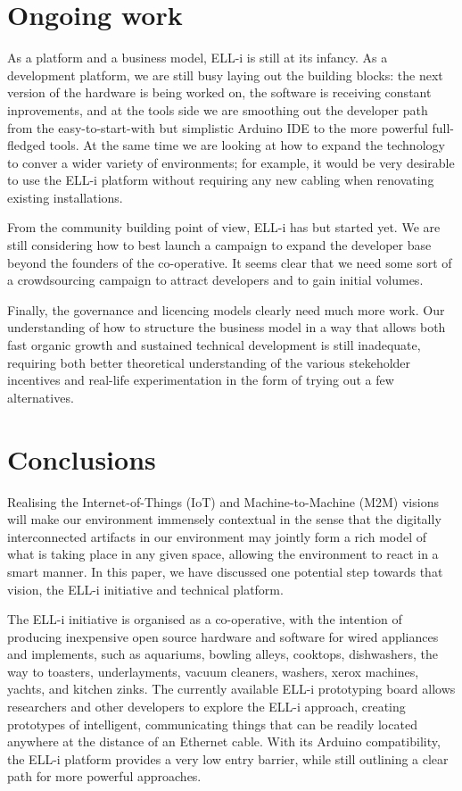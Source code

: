 \documentclass[draft,a4paper]{siamltex}
\begin{document}
\section{Ongoing work}
\label{sec:ongoing}

As a platform and a business model, ELL-i is still at its infancy.  As
a development platform, we are still busy laying out the building
blocks: the next version of the hardware is being worked on, the
software is receiving constant inprovements, and at the tools side we
are smoothing out the developer path from the easy-to-start-with but
simplistic Arduino IDE to the more powerful full-fledged tools.  At
the same time we are looking at how to expand the technology to conver
a wider variety of environments; for example, it would be very
desirable to use the ELL-i platform without requiring any new cabling
when renovating existing installations.

From the community building point of view, ELL-i has but started yet.
We are still considering how to best launch a campaign to expand the
developer base beyond the founders of the co-operative.  It seems
clear that we need some sort of a crowdsourcing campaign to attract
developers and to gain initial volumes.

Finally, the governance and licencing models clearly need much more
work.  Our understanding of how to structure the business model in a
way that allows both fast organic growth and sustained technical
development is still inadequate, requiring both better theoretical
understanding of the various stekeholder incentives and real-life
experimentation in the form of trying out a few alternatives.


\section{Conclusions}
\label{sec:conclusions}

Realising the Internet-of-Things (IoT) and Machine-to-Machine (M2M)
visions will make our environment immensely contextual in the sense
that the digitally interconnected artifacts in our environment may
jointly form a rich model of what is taking place in any given space,
allowing the environment to react in a smart manner.  In this paper,
we have discussed one potential step towards that vision, the ELL-i
initiative and technical platform.

The ELL-i initiative is organised as a co-operative, with the
intention of producing inexpensive open source hardware and software
for wired appliances and implements, such as aquariums, bowling
alleys, cooktops, dishwashers, the way to toasters, underlayments,
vacuum cleaners, washers, xerox machines, yachts, and kitchen zinks.
The currently available ELL-i prototyping board allows researchers and
other developers to explore the ELL-i approach, creating prototypes of
intelligent, communicating things that can be readily located anywhere
at the distance of an Ethernet cable.  With its Arduino compatibility,
the ELL-i platform provides a very low entry barrier, while still
outlining a clear path for more powerful approaches.
\end{document}
